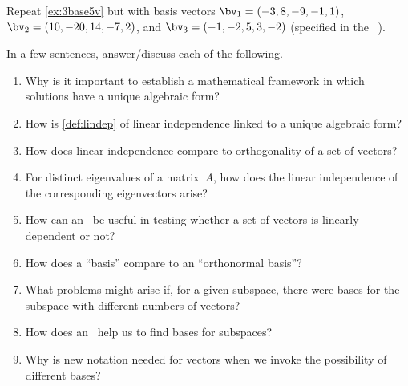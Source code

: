 \begin{exercise}  
Repeat \cref{ex:3base5v} but with basis vectors \(\bv_1=(-3,8,-9,-1,1)\), \(\bv_2=(10,-20,14,-7,2)\), and \(\bv_3=(-1,-2,5,3,-2)\) (specified in the ~\cE).
\setbox\ajrqrbox\hbox{}\marginajrbox%
\end{exercise}




\begin{exercise} 
In a few sentences, answer\slash discuss each of the following.
\begin{enumerate}
\item  Why is it important to establish a mathematical framework in which solutions have a unique algebraic form?

\item How is \cref{def:lindep} of linear independence linked to a unique algebraic form?

\item How does linear independence compare to orthogonality of a set of vectors?

\item For distinct eigenvalues of a matrix~\(A\), how does the linear independence of the corresponding eigenvectors arise?

\item How can an \svd\ be useful in testing whether a set of vectors is linearly dependent or not?

\item How does a ``basis'' compare to an ``orthonormal basis''?

\item What problems might arise if, for a given subspace, there were bases for the subspace with different numbers of vectors?

\item How does an \svd\ help us to find bases for subspaces?

\item Why is new notation needed for vectors when we invoke the possibility of different bases?

\end{enumerate}
\end{exercise}

